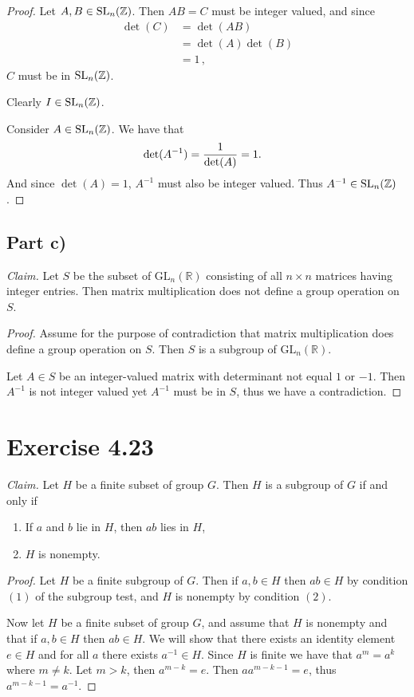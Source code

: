 \documentclass{abrice}
\newcommand{\GL}{\text{GL}}
\newcommand{\Z}{\mathbb{Z}}
\newcommand{\R}{\mathbb{R}}
\begin{document}
\begin{proof}
  Let $A,B \in \SL_n(\Z)$. Then $AB = C$ must be integer valued, and since
  \begin{align*}
    \det(C)  &= \det(AB) \\
    & = \det(A)\det(B) \\
    & = 1\, ,
  \end{align*}
  $C$ must be in $\SL_n(\Z)$.

  Clearly $I \in \SL_n(\Z)$.

  Consider $A \in \SL_n(\Z)$. We have that
  \begin{align*}
    & \det(A^{-1}) = {1 \over \det(A)} = 1.
  \end{align*}
  And since $\det(A) = 1$, $A^{-1}$ must also be integer valued. Thus $A^{-1}
  \in \SL_n(\Z)$.
\end{proof}

\subsection{Part c)}

\textit{Claim.} Let $S$ be the subset of $\GL_n(\R)$ consisting of all $n \times
n$ matrices having integer entries. Then matrix multiplication does not define a
group operation on $S$.

\begin{proof}
  Assume for the purpose of contradiction that matrix multiplication does define
  a group operation on $S$. Then $S$ is a subgroup of $\GL_n(\R)$.

  Let $A \in S$ be an integer-valued matrix with determinant not equal $1$ or
  $-1$. Then $A^{-1}$ is not integer valued yet $A^{-1}$ must be in $S$, thus
  we have a contradiction.
\end{proof}

\section{Exercise 4.23}

\textit{Claim.} Let $H$ be a finite subset of group $G$. Then $H$ is a subgroup
of $G$ if and only if
\begin{enumerate}[label=(\roman*)]
\item If $a$ and $b$ lie in $H$, then $ab$ lies in $H$,
\item $H$ is nonempty.
\end{enumerate}

\begin{proof}
  Let $H$ be a finite subgroup of $G$. Then if $a,b \in H$ then $ab \in H$ by
  condition $(1)$ of the subgroup test, and $H$ is nonempty by condition $(2)$.

  Now let $H$ be a finite subset of group $G$, and assume that $H$ is nonempty
  and that if $a,b \in H$ then $ab \in H$. We will show that there exists an
  identity element $e \in H$ and for all $a$ there exists $a^{-1} \in H$. Since
  $H$ is finite we have that $a^m = a^k$ where $m \neq k$. Let $m > k$, then
  $a^{m - k} = e$. Then $a a^{m - k - 1} = e$, thus $a^{m - k - 1} = a^{-1}$.
\end{proof}
\end{document}
